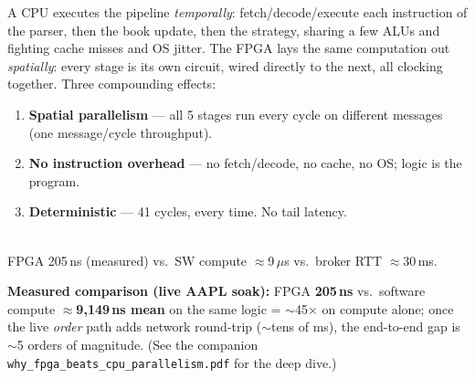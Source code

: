 \documentclass[10pt,a4paper]{article}
\newcommand{\fpath}[1]{\texttt{\textcolor{hdrblue}{#1}}}
\begin{document}
\begin{minipage}[t]{0.50\linewidth}
A CPU executes the pipeline \emph{temporally}: fetch/decode/execute each
instruction of the parser, then the book update, then the strategy, sharing a
few ALUs and fighting cache misses and OS jitter. The FPGA lays the same
computation out \emph{spatially}: every stage is its own circuit, wired directly
to the next, all clocking together. Three compounding effects:

\smallskip
\begin{enumerate}[leftmargin=1.4em, topsep=1pt, itemsep=1pt]
\item \textbf{Spatial parallelism} --- all 5 stages run every cycle on different
      messages (one message/cycle throughput).
\item \textbf{No instruction overhead} --- no fetch/decode, no cache, no OS;
      logic is the program.
\item \textbf{Deterministic} --- 41 cycles, every time. No tail latency.
\end{enumerate}
\end{minipage}\hfill
\begin{minipage}[t]{0.46\linewidth}
\centering
\vspace{-2pt}
\\[-1pt]
{\scriptsize\color{rulegray} FPGA 205\,ns (measured) vs.\ SW compute
$\approx$9\,$\mu$s vs.\ broker RTT $\approx$30\,ms.}
\end{minipage}

\smallskip
\textbf{Measured comparison (live AAPL soak):} FPGA \textbf{205\,ns} vs.\ software
compute \textbf{$\approx$9{,}149\,ns mean} on the same logic = $\sim$45$\times$ on
compute alone; once the live \emph{order} path adds network round-trip
($\sim$tens of ms), the end-to-end gap is $\sim$5 orders of magnitude. (See the
companion \fpath{why\_fpga\_beats\_cpu\_parallelism.pdf} for the deep dive.)
\end{document}
